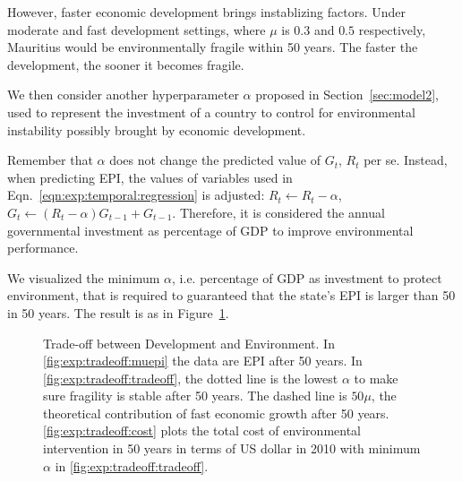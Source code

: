 However, faster economic development brings instablizing factors. Under moderate and fast development settings, where $\mu$ is $0.3$ and $0.5$ respectively, Mauritius would be environmentally fragile within 50 years. The faster the development, the sooner it becomes fragile.

We then consider another hyperparameter $\alpha$ proposed in Section~\ref{sec:model2}, used to represent the investment of a country to control for environmental instability possibly brought by economic development.

Remember that $\alpha$ does not change the predicted value of $G_t$, $R_t$ per se. Instead, when predicting EPI, the values of variables used in Eqn.~\ref{eqn:exp:temporal:regression} is adjusted: $R_t\leftarrow R_t-\alpha$, $G_t\leftarrow (R_t-\alpha)G_{t-1}+G_{t-1}$. Therefore, it is considered the annual governmental investment as percentage of GDP to improve environmental performance.

We visualized the minimum $\alpha$, i.e. percentage of GDP as investment to protect environment, that is required to guaranteed that the state's EPI is larger than 50 in 50 years. The result is as in Figure~\ref{fig:exp:tradeoff}.
\begin{figure}[htbp]
   \centering
   \caption{Trade-off between Development and Environment. In \ref{fig:exp:tradeoff:muepi} the data are EPI after 50 years. In \ref{fig:exp:tradeoff:tradeoff}, the dotted line is the lowest $\alpha$ to make sure fragility is stable after 50 years. The dashed line is $50\mu$, the theoretical contribution of fast economic growth after 50 years. \ref{fig:exp:tradeoff:cost} plots the total cost of environmental intervention in 50 years in terms of US dollar in 2010 with minimum $\alpha$ in \ref{fig:exp:tradeoff:tradeoff}.}
   \label{fig:exp:tradeoff}
\end{figure}

